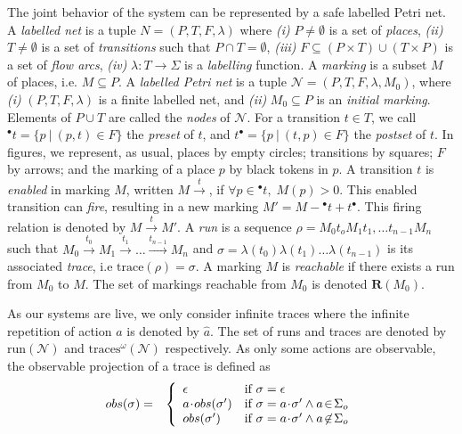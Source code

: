\documentclass[a4paper]{article}
\newcommand{\trace}[1]{\textrm{trace}(#1)}
\newcommand{\obs}[1]{obs(#1)}
\newcommand\move[1]{\stackrel{#1}{\longrightarrow }}
\newcommand\onlynetn{{\mathit{N}}}
\newcommand{\places}{\mathit{P}}
\newcommand\placen{\mathit{p}}
\newcommand\transn{\mathit{t}}
\newcommand\trans{{\mathit{T}}}
\newcommand\netn{{\mathcal{N}}}
\newcommand\flow{\mathit{F}}
\newcommand{\preset}[1]{{{}^\bullet{#1}}}
\newcommand{\postset}[1]{{#1}^\bullet}
\newcommand{\markn}{\mathit{M}}
\newcommand\reach{\mathbf{R}}
\newcommand{\runs}[1]{\mathrm{run}(#1)}
\newcommand{\inftraces}[1]{\mathrm{traces}^{\omega}(#1)}
\begin{document}
The joint behavior of the system can be represented by a safe labelled Petri net. A \emph{labelled net} is a tuple $\onlynetn=(\places,\trans,\flow,\lambda)$ where \emph{(i)}  $\places\ne\emptyset$ is a set of \emph{places}, \emph{(ii)}  $\trans\ne\emptyset$ is a set of \emph{transitions} such that $\places\cap\trans=\emptyset$, \emph{(iii)}  $\flow\subseteq(\places\times\trans)\cup(\trans\times\places)$ is a set of \emph{flow arcs}, \emph{(iv)} $\lambda: T \rightarrow \Sigma$ is a \emph{labelling} function. A \emph{marking} is a subset $\markn$ of places, i.e. $\markn\subseteq \places$. A \emph{labelled Petri net} is a tuple $\netn=(\places,\trans,\flow,\lambda, \markn_0)$, where \emph{(i)} $(\places,\trans,\flow,\lambda)$ is a finite labelled net, and \emph{(ii)} $\markn_0 \subseteq \places$ is an \emph{initial marking}. Elements of $\places\cup\trans$ are called the \emph{nodes} of $\netn$. For a transition  $\transn\in\trans$, we call $\preset{\transn}=\{\placen\ |\ (\placen,\transn)\in\flow\}$ the \emph{preset} of $t$, and $\postset{t}=\{p\ |\ (t,p)\in\flow\}$ the \emph{postset} of $\transn$. In figures, we represent, as usual, places by empty circles; transitions by squares; $\flow$ by arrows; and the marking of a place $\placen$ by  black tokens in $\placen$.  A transition $\transn$ is \emph{enabled} in marking $\markn$, written $\markn\move{\transn}$, if $\forall \placen\in\preset{\transn},\; \markn(\placen) > 0$. This enabled transition can \emph{fire}, resulting in a new marking $\markn'=\markn-{\preset{\transn}}+{\postset{\transn}}$. This firing relation is denoted by $\markn\move{\transn}\markn'$. A \emph{run} is a sequence $\rho=M_0t_oM_1t_1,\dots t_{n-1}M_n$ such that $M_0 \move{t_0} M_1 \move{t_1} \dots \move{t_{n-1}} M_n$ and $\sigma= \lambda(t_0)\lambda(t_1)\dots\lambda(t_{n-1})$ is its associated \emph{trace}, i.e $\trace{\rho}=\sigma$. A marking $\markn$ is \emph{reachable} if there exists a run from $M_0$ to $M$. The set of markings reachable from $\markn_0$ is denoted $\reach(\markn_0)$. 

As our systems are live, we only consider infinite traces where the infinite repetition of action $a$ is denoted by $\widehat a$. The set of runs and traces are denoted by $\runs \netn$ and $\inftraces \netn$ respectively. As only some actions are observable, the observable projection of a trace is defined as
\begin{eqnarray*}
  \obs \sigma & = &
  \left \{
  \begin{array}{l l l}
    \epsilon & \text{if } \sigma = \epsilon \\
    a\!\cdot\! \obs{\sigma'} & \text{if } \sigma = a\!\cdot\!\sigma' \land a\!\in\!\Sigma_o \\
    \obs{\sigma'} & \text{if } \sigma = a\!\cdot\!\sigma' \land a\!\not \in\!\Sigma_o \\
  \end{array}
  \right.
\end{eqnarray*}
\end{document}
